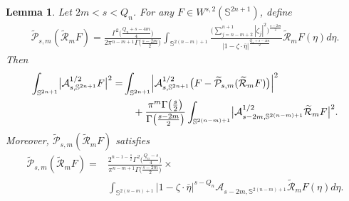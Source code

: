 \documentclass[12pt,reqno]{amsart}%
\theoremstyle{plain}
\newtheorem{lemma}{Lemma}[section]
\numberwithin{equation}{section}
\begin{document}
\begin{lemma}\label{lm4.3}
Let \(2m < s < Q_n\). For any \(F \in W^{s,2}(\mathbb{S}^{2n+1})\), define
\begin{align}\label{b3.2}
\widetilde{\mathcal{P}}_{s,m}(\widetilde{\mathcal{R}}_{m}F)
=
\frac{\Gamma^{2}\bigl(\frac{Q_n+s-4m}{4}\bigr)}
{2\pi^{n-m+1}\Gamma\bigl(\frac{s-2m}{2}\bigr)}
\int_{\mathbb{S}^{2(n-m)+1}} \frac{\bigl(\sum\limits_{j=n-m+2}^{n+1}|\zeta_{j}|^{2}\bigr)^{\frac{s-2m}{2}}}
{|1-\zeta\cdot\overline{\eta}|^{\frac{Q_n+s-4m}{2}}}
\widetilde{\mathcal{R}}_{m}F(\eta)d\eta .
\end{align}
Then
\begin{align}\nonumber
\int_{\mathbb{S}^{2n+1}}\bigl|\mathcal{A}_{s,\mathbb{S}^{2n+1}}^{1/2}F\bigr|^{2}
=& \int_{\mathbb{S}^{2n+1}}\Bigl|\mathcal{A}_{s,\mathbb{S}^{2n+1}}^{1/2}\bigl(F-
\widetilde{\mathcal{P}}_{s,m}(\widetilde{\mathcal{R}}_{m}F)\bigr)\Bigr|^{2} \\
\label{b4.3}
&\quad + \frac{\pi^{m}\Gamma\bigl(\frac{s}{2}\bigr)}{\Gamma\bigl(\frac{s-2m}{2}\bigr)}
\int_{\mathbb{S}^{2(n-m)+1}}\bigl|\mathcal{A}_{s-2m,\mathbb{S}^{2(n-m)+1}}^{1/2}
\widetilde{\mathcal{R}}_{m}F\bigr|^{2}.
\end{align}
Moreover, $\widetilde{\mathcal{P}}_{s,m}(\widetilde{\mathcal{R}}_{m}F)$ satisfies
\begin{align}\nonumber
\widetilde{\mathcal{P}}_{s,m}(\widetilde{\mathcal{R}}_{m}F)
= &\frac{2^{n-1-\frac{s}{2}}\Gamma^{2}\bigl(\frac{Q_n-s}{4}\bigr)}
{\pi^{n-m+1}\Gamma\bigl(\frac{s-2m}{2}\bigr)}\times\\
\label{4.3}
&
\int_{\mathbb{S}^{2(n-m)+1}}|1-\zeta\cdot\overline{\eta}|^{s-Q_n}
\mathcal{A}_{s-2m,\mathbb{S}^{2(n-m)+1}}\widetilde{\mathcal{R}}_{m}F(\eta)d\eta .
\end{align}
\end{lemma}
\end{document}
